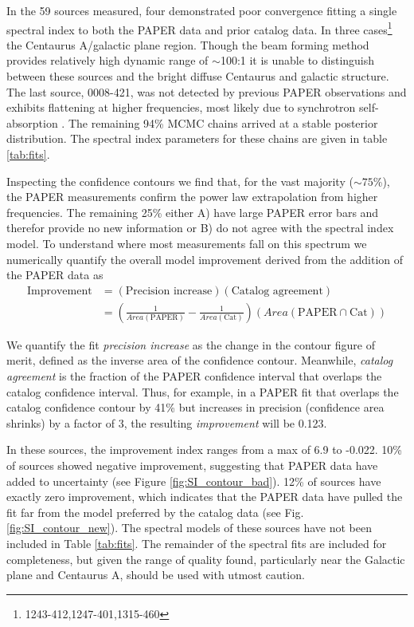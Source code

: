 \documentclass[preprint]{aastex}
\newcommand{\PAPER}{\mathrm{PAPER}}
\begin{document}

In the 59 sources measured, four demonstrated poor convergence fitting a single
spectral index to both the PAPER data and prior catalog data. In three
cases\footnote{1243-412,1247-401,1315-460} %
the Centaurus A/galactic plane region. Though the beam forming method provides
relatively high dynamic range of $\sim$100:1 it is unable to distinguish
between these sources and the bright diffuse Centaurus and galactic structure.
The last source, 0008-421, was not detected by previous PAPER observations and
exhibits flattening at higher frequencies, most likely due to synchrotron
self-absorption \citep{Jacobs:2011p8438} .  The remaining 94\% MCMC chains
arrived at a stable posterior distribution. The spectral index parameters for
these chains are given in table \ref{tab:fits}.

Inspecting the confidence contours we find that, for the vast majority ($\sim
75$\%), the PAPER measurements confirm the power law extrapolation from higher
frequencies. The remaining 25\% either A) have large PAPER error bars and
therefor provide no new information or B) do not agree with the spectral index
model.  To understand where most measurements fall on this spectrum we
numerically quantify the overall model improvement derived from the addition of
the PAPER data as 
\begin{align}
\textrm{Improvement} &= \left(\textrm{Precision increase}\right) \left(\textrm{Catalog agreement}\right)\\
&= \left(\frac{1}{Area(\textrm{PAPER})} - \frac{1}{Area(\textrm{Cat})}\right) \left( Area(\PAPER \cap \textrm{Cat}) \right)
\end{align}

We quantify the fit {\em precision increase} as the change in the contour
figure of merit, defined as the inverse area of the confidence contour.
Meanwhile, {\em catalog agreement} is the fraction of the PAPER confidence
interval that overlaps the catalog confidence interval.  Thus, for example, in
a PAPER fit that overlaps the catalog confidence contour by 41\% but increases
in precision (confidence area shrinks) by a factor of 3, the resulting {\em
improvement} will be 0.123.  

In these sources, the improvement index ranges from a max of 6.9 to -0.022.
10\% of sources showed negative improvement, suggesting that PAPER data have
added to uncertainty (see Figure \ref{fig:SI_contour_bad}). 12\% of sources
have exactly zero improvement, which indicates that the PAPER data have pulled
the fit far from the model preferred by the catalog data (see Fig.
\ref{fig:SI_contour_new}).  The spectral models of these sources have not been
included in Table \ref{tab:fits}.  The remainder of the spectral fits are
included for completeness, but given the range of quality found, particularly
near the Galactic plane and Centaurus A, should be used with utmost caution.
\end{document}
